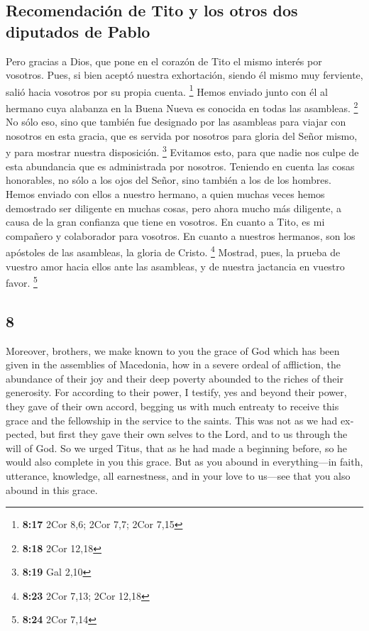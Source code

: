 \begin{paracol}{2}
\hypertarget{recomendaciuxf3n-de-tito-y-los-otros-dos-diputados-de-pablo}{%
\subsection{Recomendación de Tito y los otros dos diputados de
Pablo}\label{recomendaciuxf3n-de-tito-y-los-otros-dos-diputados-de-pablo}}

 Pero gracias a Dios, que pone en el corazón de Tito el
mismo interés por vosotros.  Pues, si bien aceptó nuestra
exhortación, siendo él mismo muy ferviente, salió hacia vosotros por su
propia cuenta. \footnote{\textbf{8:17} 2Cor 8,6; 2Cor 7,7; 2Cor 7,15}
 Hemos enviado junto con él al hermano cuya alabanza en
la Buena Nueva es conocida en todas las asambleas. \footnote{\textbf{8:18}
  2Cor 12,18}  No sólo eso, sino que también fue
designado por las asambleas para viajar con nosotros en esta gracia, que
es servida por nosotros para gloria del Señor mismo, y para mostrar
nuestra disposición. \footnote{\textbf{8:19} Gal 2,10} 
Evitamos esto, para que nadie nos culpe de esta abundancia que es
administrada por nosotros.  Teniendo en cuenta las cosas
honorables, no sólo a los ojos del Señor, sino también a los de los
hombres.  Hemos enviado con ellos a nuestro hermano, a
quien muchas veces hemos demostrado ser diligente en muchas cosas, pero
ahora mucho más diligente, a causa de la gran confianza que tiene en
vosotros.  En cuanto a Tito, es mi compañero y
colaborador para vosotros. En cuanto a nuestros hermanos, son los
apóstoles de las asambleas, la gloria de Cristo. \footnote{\textbf{8:23}
  2Cor 7,13; 2Cor 12,18}  Mostrad, pues, la prueba de
vuestro amor hacia ellos ante las asambleas, y de nuestra jactancia en
vuestro favor. \footnote{\textbf{8:24} 2Cor 7,14}

\switchcolumn
\begin{otherlanguage}{english}

\hypertarget{section-15}{%
\section{8}\label{section-15}}

 Moreover, brothers, we make known to you the grace of God
which has been given in the assemblies of Macedonia,  how
in a severe ordeal of affliction, the abundance of their joy and their
deep poverty abounded to the riches of their generosity. 
For according to their power, I testify, yes and beyond their power,
they gave of their own accord,  begging us with much
entreaty to receive this grace and the fellowship in the service to the
saints.  This was not as we had expected, but first they
gave their own selves to the Lord, and to us through the will of God.
 So we urged Titus, that as he had made a beginning
before, so he would also complete in you this grace.  But
as you abound in everything---in faith, utterance, knowledge, all
earnestness, and in your love to us---see that you also abound in this
grace.


\end{otherlanguage}
\end{paracol}
